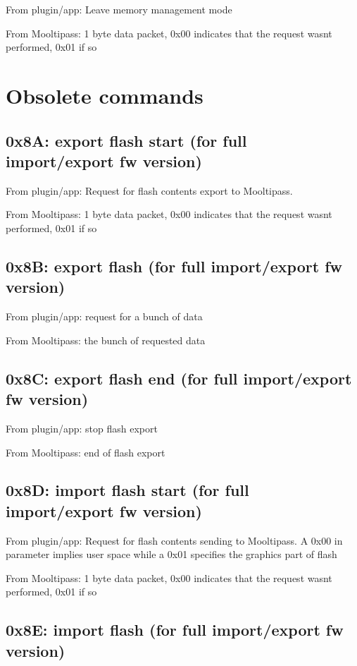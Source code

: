 From plugin/app\+: Leave memory management mode

From Mooltipass\+: 1 byte data packet, 0x00 indicates that the request wasn\textquotesingle{}t performed, 0x01 if so

\section*{Obsolete commands }

\subsection*{0x8A\+: export flash start (for full import/export fw version) }

From plugin/app\+: Request for flash contents export to Mooltipass.

From Mooltipass\+: 1 byte data packet, 0x00 indicates that the request wasn\textquotesingle{}t performed, 0x01 if so

\subsection*{0x8B\+: export flash (for full import/export fw version) }

From plugin/app\+: request for a bunch of data

From Mooltipass\+: the bunch of requested data

\subsection*{0x8C\+: export flash end (for full import/export fw version) }

From plugin/app\+: stop flash export

From Mooltipass\+: end of flash export

\subsection*{0x8D\+: import flash start (for full import/export fw version) }

From plugin/app\+: Request for flash contents sending to Mooltipass. A 0x00 in parameter implies user space while a 0x01 specifies the graphics part of flash

From Mooltipass\+: 1 byte data packet, 0x00 indicates that the request wasn\textquotesingle{}t performed, 0x01 if so

\subsection*{0x8E\+: import flash (for full import/export fw version) }

